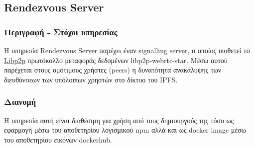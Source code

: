 \subsection{Rendezvous Server} \label{subsection:4-3-7-rendezvous-server-service}

\subsubsection{Περιγραφή - Στόχοι υπηρεσίας}

Η υπηρεσία Rendezvous Server παρέχει έναν signalling server, ο οποίος υιοθετεί το \hyperref[subsection:4-2-4-3-libp2p]{Libp2p} πρωτόκολλο μεταφοράς δεδομένων libp2p-webrtc-star. Μέσω αυτού παρέχεται στους ομότιμους χρήστες (peers) η δυνατότητα ανακάλυψης των διευθύνσεων των υπόλοιπων χρηστών στο δίκτυο του IPFS.

\subsubsection{Διανομή}

Η υπηρεσία αυτή είναι διαθέσιμη για χρήση από τους δημιουργούς της τόσο ως εφαρμογή μέσω του αποθετηρίου λογισμικού npm αλλά και ως docker image μέσω του αποθετηρίου εικόνων dockerhub.